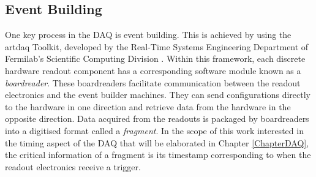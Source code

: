
\subsection{Event Building}
\label{sec:evb}

One key process in the DAQ is event building.
This is achieved by using the artdaq Toolkit, developed by the Real-Time Systems Engineering Department of Fermilab's Scientific Computing Division \cite{artdaq_note}. 
Within this framework, each discrete hardware readout component has a corresponding software module known as a \textit{boardreader}.
These boardreaders facilitate communication between the readout electronics and the event builder machines. 
They can send configurations directly to the hardware in one direction and retrieve data from the hardware in the opposite direction.
Data acquired from the readouts is packaged by boardreaders into a digitised format called a \textit{fragment}.
In the scope of this work interested in the timing aspect of the DAQ that will be elaborated in Chapter \ref{ChapterDAQ}, the critical information of a fragment is its timestamp corresponding to when the readout electronics receive a trigger.




